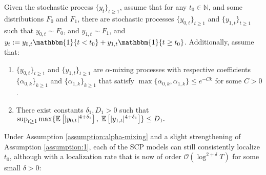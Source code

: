 \begin{assumption}\label{assumption:alpha-mixing}
    Given the stochastic process $\{y_t\}_{t\geq 1}$, assume that for any $t_0 \in \mathbb{N}$, and some distributions $F_0$ and $F_1$, there are stochastic processes $\{y_{0,t}\}_{t \geq 1}$ and $\{y_{1,t}\}_{t \geq 1}$ such that $y_{0,t} \sim F_0$, and $y_{1,t} \sim F_1$, and $y_t := y_{0,t} \mathbbm{1}\{t < t_0\}  + y_{1,t}\mathbbm{1}\{t \geq t_0\}$. Additionally, assume that:
    \vspace{-10pt}
    \begin{enumerate}[label=\normalfont(\roman*)]
        \item $\{y_{0,t}\}_{t \geq 1}$ and $\{y_{1,t}\}_{t \geq 1}$ are $\alpha$-mixing processes with respective coefficients $\{\alpha_{0,k}\}_{k\geq 1}$ and $\{\alpha_{1,k}\}_{k\geq 1}$ that satisfy $\max\{\alpha_{0,k}, \alpha_{1,k}\} \leq e^{-C k}$ for some $C > 0$. \vspace{-5pt}
        \item There exist constants $\delta_1, D_1 > 0$ such that $\sup_{t \geq 1} \max\{\mathbb{E}\left[|y_{0,t}|^{4+\delta_1}\right],\;\mathbb{E}\left[|y_{1,t}|^{4+\delta_1}\right]\}\leq D_1.$  
    \end{enumerate}
\end{assumption}
Under Assumption \ref{assumption:alpha-mixing} and a slight strengthening of Assumption \ref{assumption:1}, each of the SCP models can still consistently localize $t_0$, although with a localization rate that is now of order $\mathcal{O}(\log^{2+\delta} T)$ for some small $\delta > 0$:
